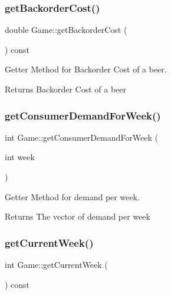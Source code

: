 \subsubsection{\texorpdfstring{get\+Backorder\+Cost()}{getBackorderCost()}}
{\footnotesize\ttfamily double Game\+::get\+Backorder\+Cost (\begin{DoxyParamCaption}{ }\end{DoxyParamCaption}) const}



Getter Method for Backorder Cost of a beer. 

\begin{DoxyReturn}{Returns}
Backorder Cost of a beer 
\end{DoxyReturn}
\mbox{\label{classGame_ac93de1c13e90c1f729d7dbd19b62385c}} 
\subsubsection{\texorpdfstring{get\+Consumer\+Demand\+For\+Week()}{getConsumerDemandForWeek()}}
{\footnotesize\ttfamily int Game\+::get\+Consumer\+Demand\+For\+Week (\begin{DoxyParamCaption}\item[{int}]{week }\end{DoxyParamCaption})}



Getter Method for demand per week. 

\begin{DoxyReturn}{Returns}
The vector of demand per week 
\end{DoxyReturn}
\mbox{\label{classGame_aa4d5959a4edb54d944b93c83725229aa}} 
\subsubsection{\texorpdfstring{get\+Current\+Week()}{getCurrentWeek()}}
{\footnotesize\ttfamily int Game\+::get\+Current\+Week (\begin{DoxyParamCaption}{ }\end{DoxyParamCaption}) const}



